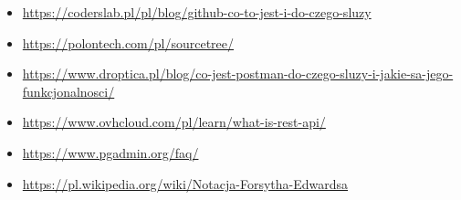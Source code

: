\documentclass[twoside]{projektInzynierskiMS1}
\begin{document}
\begin{itemize}
    \item \href{https://coderslab.pl/pl/blog/github-co-to-jest-i-do-czego-sluzy}{https://coderslab.pl/pl/blog/github-co-to-jest-i-do-czego-sluzy}
    \item \href{https://polontech.com/pl/sourcetree/}{https://polontech.com/pl/sourcetree/}
    \item \href{https://www.droptica.pl/blog/co-jest-postman-do-czego-sluzy-i-jakie-sa-jego-funkcjonalnosci/}{https://www.droptica.pl/blog/co-jest-postman-do-czego-sluzy-i-jakie-sa-jego-funkcjonalnosci/}
    \item \href{https://www.ovhcloud.com/pl/learn/what-is-rest-api/}{https://www.ovhcloud.com/pl/learn/what-is-rest-api/}
    \item \href{https://www.pgadmin.org/faq/}{https://www.pgadmin.org/faq/}
    \item \href{https://pl.wikipedia.org/wiki/Notacja-Forsytha-Edwardsa}{https://pl.wikipedia.org/wiki/Notacja-Forsytha-Edwardsa}
\end{itemize}
\end{document}

